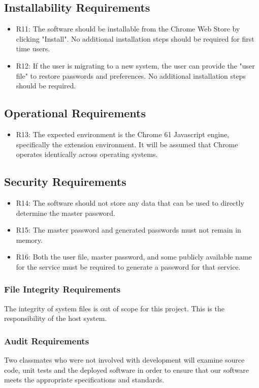 \documentclass[12pt]{article}
\begin{document}
\subsection{Installability Requirements}
\begin{itemize}
\item R11: The software should be installable from the Chrome Web Store by clicking "Install". No additional installation steps should be required for first time users.
\item R12: If the user is migrating to a new system, the user can provide the "user file" to restore passwords and preferences. No additional installation steps should be required.
\end{itemize}

\subsection{Operational Requirements}
\begin{itemize}
\item R13: The expected environment is the Chrome 61 Javascript engine, specifically the extension environment. It will be assumed that Chrome operates identically across operating systems.
\end{itemize}

\subsection{Security Requirements}
\begin{itemize}
\item R14: The software should not store any data that can be used to directly determine the master password.
\item R15: The master password and generated passwords must not remain in memory.
\item R16: Both the user file, master password, and some publicly available name for the service must be required to generate a password for that service.
\end{itemize}

\subsubsection{File Integrity Requirements}
The integrity of system files is out of scope for this project. This is the responsibility of the host system.

\subsubsection{Audit Requirements}
Two classmates who were not involved with development will examine source code, unit tests and the deployed software in order to ensure that our software meets the appropriate specifications and standards.
\end{document}
